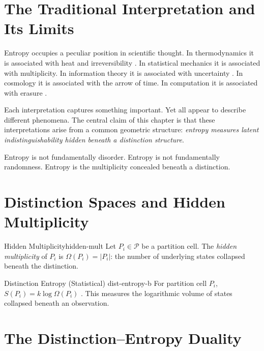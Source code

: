 \documentclass[12pt,twoside,openright]{book}
\newcommand{\partition}{\mathcal{P}}
\begin{document}
\section{The Traditional Interpretation and Its Limits}
\label{sec:ch3-trad}

Entropy occupies a peculiar position in scientific
thought. In thermodynamics it is associated with heat
and irreversibility \parencite{boltzmann1877,gibbs1902}.
In statistical mechanics it is associated with
multiplicity. In information theory it is associated with
uncertainty \parencite{jaynes1957}. In cosmology it is
associated with the arrow of time. In computation it is
associated with erasure \parencite{landauer1961irreversibility}.

Each interpretation captures something important. Yet all
appear to describe different phenomena. The central claim
of this chapter is that these interpretations arise from
a common geometric structure: \emph{entropy measures
latent indistinguishability hidden beneath a distinction
structure}.

Entropy is not fundamentally disorder. Entropy is not
fundamentally randomness. Entropy is the multiplicity
concealed beneath a distinction.

\section{Distinction Spaces and Hidden Multiplicity}
\label{sec:ch3-hidden}

\begin{definition}{Hidden Multiplicity}{hidden-mult}
  Let $P_i \in \partition$ be a partition cell.
  The \emph{hidden multiplicity} of $P_i$ is
  $\Omega(P_i) = |P_i|$: the number of underlying
  states collapsed beneath the distinction.
\end{definition}

\begin{definition}{Distinction Entropy (Statistical)}%
  {dist-entropy-b}
  For partition cell $P_i$,
  $S(P_i) = k \log \Omega(P_i)$
  \parencite{boltzmann1877}.
  This measures the logarithmic volume of states
  collapsed beneath an observation.
\end{definition}

\section{The Distinction--Entropy Duality}
\label{sec:ch3-duality}
\end{document}
